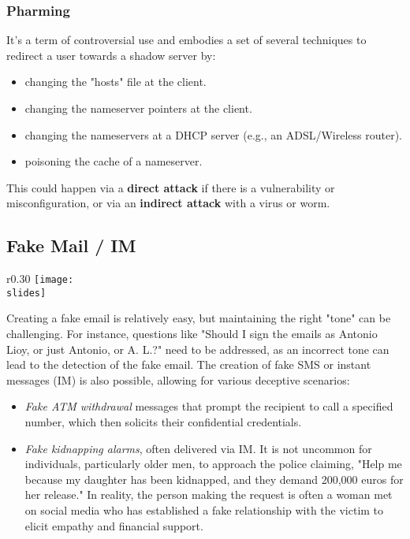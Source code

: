 \subsubsection*{Pharming}
It's a term of controversial use and embodies a set of several techniques to redirect a user towards a shadow server by:
\begin{itemize}
  \item changing the "hosts" file at the client.
  \item changing the nameserver pointers at the client.
  \item changing the nameservers at a DHCP server (e.g., an ADSL/Wireless router).
  \item poisoning the cache of a nameserver.
\end{itemize}
This could happen via a \textbf{direct attack} if there is a vulnerability or misconfiguration, or via an \textbf{indirect attack} with a virus or worm.


\subsection*{Fake Mail / IM}
\begin{wrapfigure}{r}{0.30\textwidth}
  \centering
  \texttt{[image: \\slides]}
\end{wrapfigure}
Creating a fake email is relatively easy, but maintaining the right "tone" can be challenging. For instance, questions like "Should I sign the emails as Antonio Lioy, or just Antonio, or A. L.?" need to be addressed, as an incorrect tone can lead to the detection of the fake email. The creation of fake SMS or instant messages (IM) is also possible, allowing for various deceptive scenarios:
\begin{itemize}
  \item \emph{Fake ATM withdrawal} messages that prompt the recipient to call a specified number, which then solicits their confidential credentials.
  \item \emph{Fake kidnapping alarms}, often delivered via IM. It is not uncommon for individuals, particularly older men, to approach the police claiming, "Help me because my daughter has been kidnapped, and they demand 200,000 euros for her release." In reality, the person making the request is often a woman met on social media who has established a fake relationship with the victim to elicit empathy and financial support.
\end{itemize}


